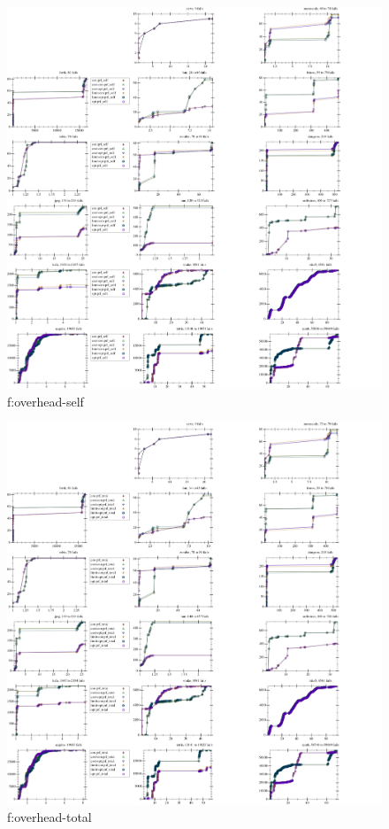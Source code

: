 \begin{figure}[t]
  \includegraphics[width=\textwidth]{data/cdf-overhead_prf_self.pdf}
  \caption{f:overhead-self}
  \label{f:overhead-self}
\end{figure}

\begin{figure}[t]
  \includegraphics[width=\textwidth]{data/cdf-overhead_prf_total.pdf}
  \caption{f:overhead-total}
  \label{f:overhead-total}
\end{figure}

